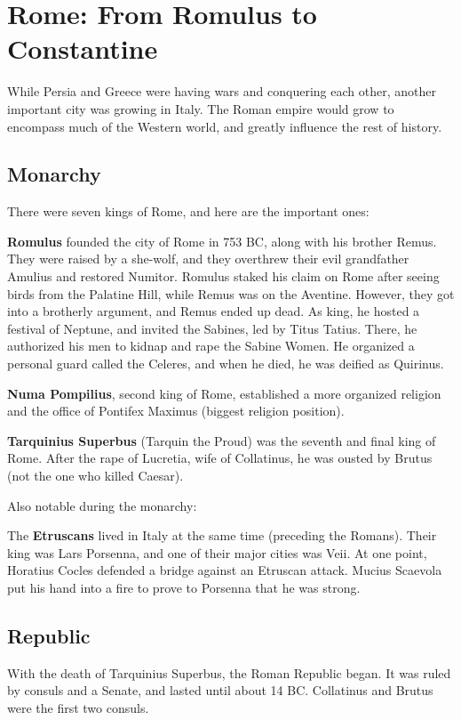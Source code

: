 \section{Rome: From Romulus to Constantine}

While Persia and Greece were having wars and conquering each other, another important city was growing in Italy.
The Roman empire would grow to encompass much of the Western world,
and greatly influence the rest of history.

\subsection*{Monarchy}

There were seven kings of Rome, and here are the important ones:

\textbf{Romulus} founded the city of Rome in 753 BC, along with his brother Remus.
They were raised by a she-wolf, and they overthrew their evil grandfather Amulius and restored Numitor.
Romulus staked his claim on Rome after seeing birds from the Palatine Hill, while Remus was on the Aventine.
However, they got into a brotherly argument, and Remus ended up dead.
As king, he hosted a festival of Neptune, and invited the Sabines, led by Titus Tatius.
There, he authorized his men to kidnap and rape the Sabine Women.
He organized a personal guard called the Celeres,
and when he died, he was deified as Quirinus.

\textbf{Numa Pompilius}, second king of Rome,
established a more organized religion and the office of Pontifex Maximus (biggest religion position).

\textbf{Tarquinius Superbus} (Tarquin the Proud) was the seventh and final king of Rome.
After the rape of Lucretia, wife of Collatinus, he was ousted by Brutus (not the one who killed Caesar).

Also notable during the monarchy:

The \textbf{Etruscans} lived in Italy at the same time (preceding the Romans).
Their king was Lars Porsenna, and one of their major cities was Veii.
At one point, Horatius Cocles defended a bridge against an Etruscan attack.
Mucius Scaevola put his hand into a fire to prove to Porsenna that he was strong.

\subsection*{Republic}

With the death of Tarquinius Superbus, the Roman Republic began.
It was ruled by consuls and a Senate, and lasted until about 14 BC\@.
Collatinus and Brutus were the first two consuls.

